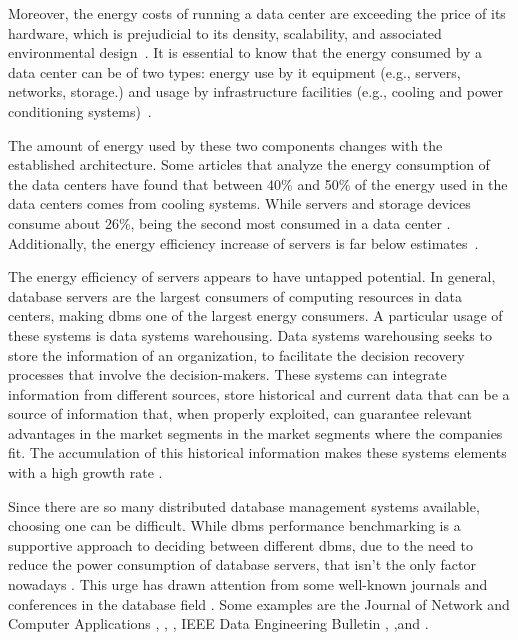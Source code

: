 Moreover, the energy costs of running a data center are exceeding the price of its hardware, which is prejudicial to its density, scalability, and associated environmental design~\cite{jin2014survey,rasmussen2011determining,greenframework}. 
It is essential to know that the energy consumed by a data center can be of two types: energy use by \gls{it} equipment (e.g., servers, networks, storage.) and usage by infrastructure facilities (e.g., cooling and power conditioning systems)~\cite{dayarathna2015data,portela2016}.


The amount of energy used by these two components changes with the established architecture. Some articles that analyze the energy consumption of the data centers have found that between 40\% and 50\% of the energy used in the data centers comes from cooling systems. While servers and storage devices consume about 26\%, being the second most consumed in a data center \cite{portela2016,dayarathna2015data,info2007top,VANHEDDEGHEM201464}. 
Additionally, the energy efficiency increase of servers is far below estimates~\cite{graefe2008database,jin2014survey}.

The energy efficiency of servers appears to have untapped potential. In general, database servers are the largest consumers of computing resources in data centers, making \gls{dbms} one of the largest energy consumers. A particular usage of these systems is data systems warehousing. Data systems warehousing seeks to store the information of an organization, to facilitate the decision recovery processes that involve the decision-makers. These systems can integrate information from different sources, store historical and current data that can be a source of information that, when properly exploited, can guarantee relevant advantages in the market segments in the market segments where the companies fit. The accumulation of this historical information makes these systems elements with a high growth rate \cite{inmon1996data,gonccalves2014estabelecimento,inmon1995data}. 





Since there are so many distributed database management systems available, choosing one can be difficult. While \gls{dbms} performance benchmarking is a supportive approach to deciding between different \gls{dbms}, due to the need to reduce the power consumption of database servers, that isn't the only factor nowadays \cite{greenframework,seybold2019mowgli}. This urge has drawn attention from some well-known journals and conferences in the database field \cite{greenframework}. 
Some examples are the Journal of Network and Computer Applications \cite{greenframework},  \cite{gesi2008enabling},  \cite{xu2010building} , IEEE Data Engineering Bulletin \cite{lang2011rethinking},  \cite{pelley2011query},and  \cite{tu2011power}.


